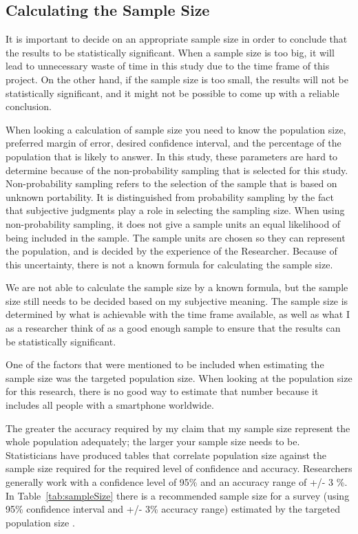   \subsection{Calculating the Sample Size} \label{sec:samplesize}

    It is important to decide on an appropriate sample size in order to conclude that the results to be statistically significant. When a sample size is too big, it will lead to unnecessary waste of time in this study due to the time frame of this project. On the other hand, if the sample size is too small, the results will not be statistically significant, and it might not be possible to come up with a reliable conclusion.

    When looking a calculation of sample size you need to know the population size, preferred margin of error, desired confidence interval, and the percentage of the population that is likely to answer. In this study, these parameters are hard to determine because of the non-probability sampling that is selected for this study. Non-probability sampling refers to the selection of the sample that is based on unknown portability. It is distinguished from probability sampling by the fact that subjective judgments play a role in selecting the sampling size. When using non-probability sampling, it does not give a sample units an equal likelihood of being included in the sample. The sample units are chosen so they can represent the population, and is decided by the experience of the Researcher. Because of this uncertainty, there is not a known formula for calculating the sample size.

    We are not able to calculate the sample size by a known formula, but the sample size still needs to be decided based on my subjective meaning. The sample size is determined by what is achievable with the time frame available, as well as what I as a researcher think of as a good enough sample to ensure that the results can be statistically significant.

    One of the factors that were mentioned to be included when estimating the sample size was the targeted population size. When looking at the population size for this research, there is no good way to estimate that number because it includes all people with a smartphone worldwide.

    The greater the accuracy required by my claim that my sample size represent the whole population adequately; the larger your sample size needs to be. Statisticians have produced tables that correlate population size against the sample size required for the required level of confidence and accuracy. Researchers generally work with a confidence level of 95\% and an accuracy range of +/- 3 \%. In Table~\ref{tab:sampleSize} there is a recommended sample size for a survey (using 95\% confidence interval and +/- 3\% accuracy range) estimated by the targeted population size \cite{empiriske}.

